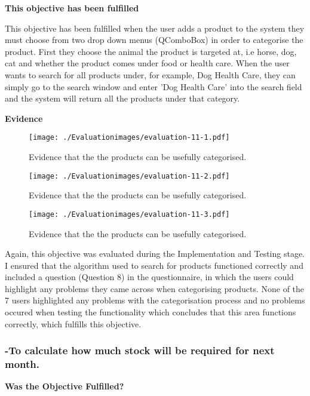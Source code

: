 \textbf{\large{This objective has been fulfilled}}

This objective has been fulfilled when the user adds a product to the system they must choose from two drop down menus (QComboBox) in order to categorise the product. First they choose the animal the product is targeted at, i.e horse, dog, cat and whether the product comes under food or health care. When the user wants to search for all products under, for example, Dog Health Care, they can simply go to the search window and enter 'Dog Health Care' into the search field and the system will return all the products under that category.

\textbf{Evidence} \newline
\label{category-evidence}

\begin{figure}[H]
\caption{Evidence that the the products can be usefully categorised.} \label{fig:evaluation-11-1}
\hfill\texttt{[image: ./Evaluationimages/evaluation-11-1.pdf]}
\end{figure}

\begin{figure}[H]
\caption{Evidence that the the products can be usefully categorised.} \label{fig:evaluation-11-2}
\hfill\texttt{[image: ./Evaluationimages/evaluation-11-2.pdf]}
\end{figure}

\begin{figure}[H]
\caption{Evidence that the the products can be usefully categorised.} \label{fig:evaluation-11-3}
\hfill\texttt{[image: ./Evaluationimages/evaluation-11-3.pdf]}
\end{figure}

Again, this objective was evaluated during the Implementation and Testing stage. I ensured that the algorithm used to search for products functioned correctly and included a question (Question 8) in the questionnaire, in which the users could highlight any problems they came across when categorising products. None of the 7 users highlighted any problems with the categorisation process and no problems occured when testing the functionality which concludes that this area functions correctly, which fulfills this objective.




\pagebreak
\subsubsection{-To calculate how much stock will be required for next month.}
\label{stock-eval}
\textbf{Was the Objective Fulfilled?} \newline

